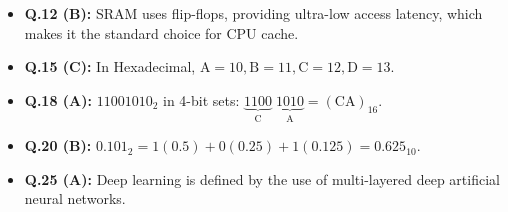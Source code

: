 \begin{expbox}
\begin{itemize}[leftmargin=5mm]
    \item \textbf{Q.12 (B):} SRAM uses flip-flops, providing ultra-low access latency, which makes it the standard choice for CPU cache.
    \item \textbf{Q.15 (C):} In Hexadecimal, $\text{A}=10, \text{B}=11, \text{C}=12, \text{D}=13$.
    \item \textbf{Q.18 (A):} $11001010_2$ in 4-bit sets: $\underbrace{1100}_{\text{C}}\;\underbrace{1010}_{\text{A}} = (\text{CA})_{16}$.
    \item \textbf{Q.20 (B):} $0.101_2 = 1(0.5) + 0(0.25) + 1(0.125) = 0.625_{10}$.
    \item \textbf{Q.25 (A):} Deep learning is defined by the use of multi-layered deep artificial neural networks.
\end{itemize}
\end{expbox}

\newpage
